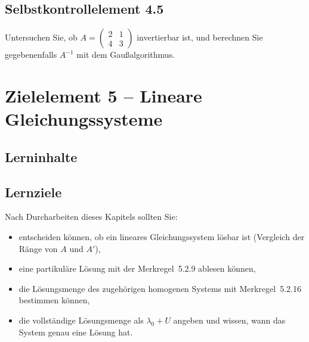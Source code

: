 \documentclass[a4paper,12pt]{article}
\begin{document}
\subsection*{Selbstkontrollelement 4.5}

Untersuchen Sie, ob $A = \begin{pmatrix} 2 & 1 \\ 4 & 3 \end{pmatrix}$ invertierbar ist,
und berechnen Sie gegebenenfalls $A^{-1}$ mit dem Gaußalgorithmus.

\newpage

\section*{Zielelement 5 -- Lineare Gleichungssysteme}

\subsection*{Lerninhalte}

\begin{center}
\end{center}

\subsection*{Lernziele}

Nach Durcharbeiten dieses Kapitels sollten Sie:
\begin{itemize}
  \item entscheiden können, ob ein lineares Gleichungssystem lösbar ist
        (Vergleich der Ränge von $A$ und $A'$),
  \item eine partikuläre Lösung mit der Merkregel~5.2.9 ablesen können,
  \item die Lösungsmenge des zugehörigen homogenen Systems mit Merkregel~5.2.16
        bestimmen können,
  \item die vollständige Lösungsmenge als $\lambda_0 + U$ angeben und wissen,
        wann das System genau eine Lösung hat.
\end{itemize}
\end{document}
